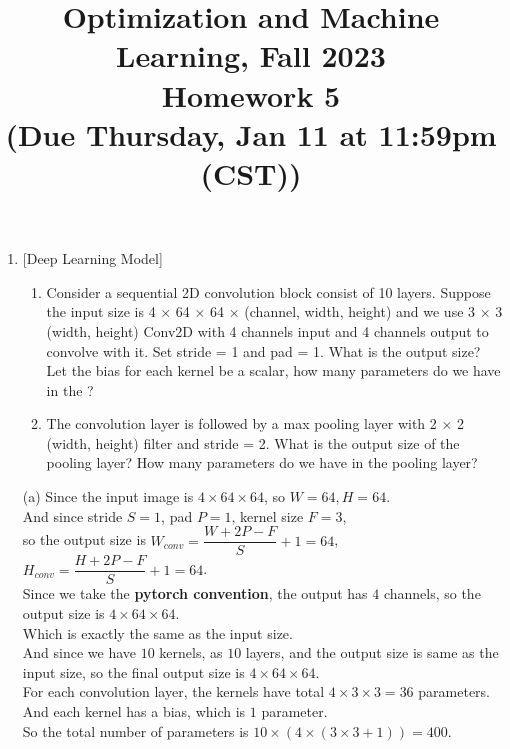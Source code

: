 \documentclass[10pt]{article}
\begin{document}
\date{}
\title{Optimization and Machine Learning, Fall 2023 \\
	Homework 5 \\
	\small (Due Thursday, Jan 11 at 11:59pm (CST))}
\maketitle
\begin{enumerate}[1.]

	\item {} [Deep Learning Model]
	\begin{enumerate}
		\item Consider a sequential 2D convolution block consist of 10 layers. Suppose the input size is 4 $\times$ 64 $\times$ 64 $\times$ (channel, width, height) and
		we use 3 $\times$ 3 (width, height) Conv2D with 4 channels input and 4 channels output to convolve with it. Set stride = 1 and pad = 1. What is the output size? Let the bias for each kernel be a scalar, how many parameters do we have in the ? 
		\item The convolution layer is followed by a max pooling layer with 2 × 2 (width, height) filter and stride
		= 2. What is the output size of the pooling layer? How many parameters do we have in the pooling
		layer? 
	\end{enumerate}
	
(a) Since the input image is $4\times 64\times 64$, so $W=64,H=64$.\\
And since stride $S=1$, pad $P=1$, kernel size $F=3$,\\
so the output size is $W_{conv}=\dfrac{W+2P-F}{S}+1=64$, $H_{conv}=\dfrac{H+2P-F}{S}+1=64$.\\
Since we take the \textbf{pytorch convention}, the output has $4$ channels, so the output size is $4\times 64\times 64$.\\
Which is exactly the same as the input size.\\
And since we have $10$ kernels, as $10$ layers, and the output size is same as the input size, so the final output size is $4\times 64\times 64$.\\

For each convolution layer, the kernels have total $4\times 3\times 3=36$ parameters.\\
And each kernel has a bias, which is $1$ parameter.\\
So the total number of parameters is $10\times (4\times(3\times 3+1))=400$.\\


\end{enumerate}
\end{document}
